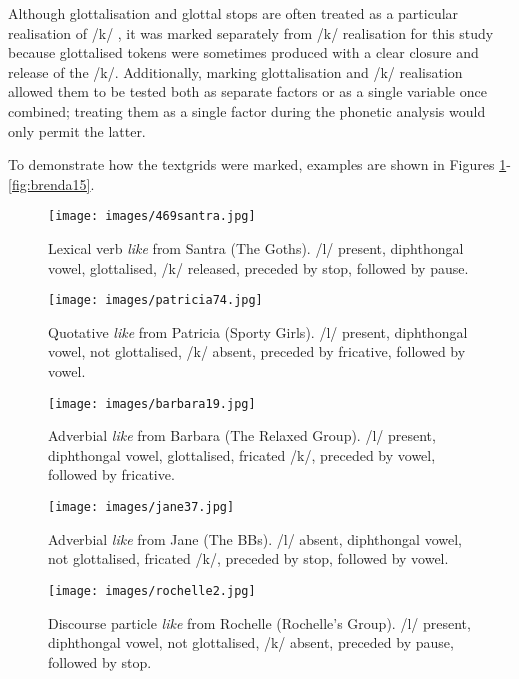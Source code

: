 \noindent Although glottalisation and glottal stops are often treated as a particular realisation of /k/ \cite{lavoie2002}, it was marked separately from /k/ realisation for this study because glottalised tokens were sometimes produced with a clear closure and release of the /k/.  Additionally, marking glottalisation and /k/ realisation allowed them to be tested both as separate factors or as a single variable once combined; treating them as a single factor during the phonetic analysis would only permit the latter. 

To demonstrate how the textgrids were marked, examples are shown in Figures \ref{fig:469santra}-\ref{fig:brenda15}.

\begin{figure}
	\centering
		\texttt{[image: images/469santra.jpg]}
		\caption{Lexical verb \textit{like} from Santra (The Goths).  /l/ present, diph\-thongal vowel, glottalised,  /k/ released, preceded by stop, followed by pause.} 
	\label{fig:469santra}
\end{figure}

\begin{figure}
	\centering
		\texttt{[image: images/patricia74.jpg]}
	\caption{Quotative \textit{like} from Patricia (Sporty Girls). /l/ present, diph\-thongal vowel, not glottalised, /k/ absent, preceded by fricative, followed by vowel.}
	\label{fig:patricia74}
\end{figure}

\begin{figure}
	\centering
		\texttt{[image: images/barbara19.jpg]}
	\caption{Adverbial \textit{like} from Barbara (The Relaxed Group). /l/ pre\-sent, diph\-thongal vowel, glottalised, fricated /k/, preceded by vowel, followed by fricative.}
	\label{fig:barbara19}
\end{figure}

\begin{figure}
	\centering
		\texttt{[image: images/jane37.jpg]}
	\caption{Adverbial \textit{like} from Jane (The BBs).  /l/ absent, diphthongal vowel, not glottalised, fricated /k/, preceded by stop, followed by vowel.}
	\label{fig:jane37}
\end{figure}

\begin{figure}
	\centering
		\texttt{[image: images/rochelle2.jpg]}
	\caption{Discourse particle \textit{like} from Rochelle (Rochelle's Group).  /l/ present, diphthongal vowel, not glottalised, /k/ absent, preceded by pause, followed by stop.}
	\label{fig:rochelle2}
\end{figure}

